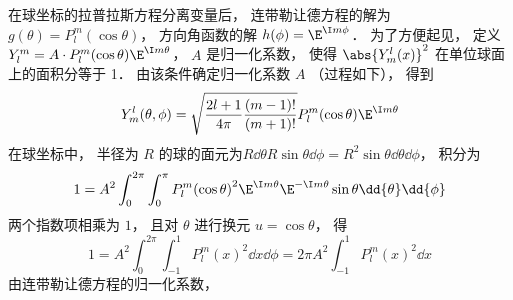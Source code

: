 

在球坐标的拉普拉斯方程分离变量后， 连带勒让德方程的解为 $g(\theta) = P_l^m(\cos\theta)$， 方向角函数的解 $h(\phi) = \E^{\I m\phi}$． 为了方便起见， 定义 $Y_l^m = A \cdot P_l^m(\cos \theta) \E^{\I m\theta}$， $A$ 是归一化系数， 使得 $\abs{Y_m^l (x)}^2$ 在单位球面上的面积分等于 1． 由该条件确定归一化系数 $A$ （过程如下）， 得到
\begin{equation}
Y_m^l (\theta ,\phi) = \sqrt{\frac{2l + 1}{4\pi }\frac{(m - 1)!}{(m + 1)!}} P_l^m (\cos\theta) \E^{\I m\theta}
\end{equation}
在球坐标中， 半径为 $R$ 的球的面元为$R \dd{\theta} R\sin\theta \dd{\phi} = R^2 \sin\theta \dd{\theta} \dd{\phi}$，  积分为
\begin{equation}
1 = A^2\int_0^{2\pi } \int_0^\pi  P_l^m{{\left( {\cos \theta } \right)}^2}{\E^{\I m\theta }}{\E^{ - \I m\theta }}\sin \theta \dd{\theta} \dd{\phi}
\end{equation}
两个指数项相乘为 $1$，  且对 $\theta$ 进行换元 $u = \cos\theta $， 得
\begin{equation}
1 = A^2 \int_0^{2\pi} \int_{-1}^1 P_l^m {{(x)}^2} \dd{x} \dd{\phi} = 2\pi A^2 \int_{-1}^1 P_l^m (x)^2 \dd{x} 
\end{equation}
由连带勒让德方程的归一化系数， %


